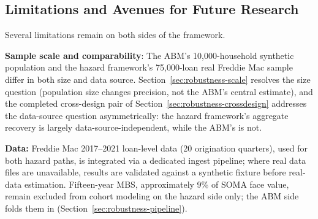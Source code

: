\documentclass[12pt]{article}
\begin{document}
\subsection{Limitations and Avenues for Future Research}\label{sec:limitations}

Several limitations remain on both sides of the framework.

\textbf{Sample scale and comparability}: The ABM's 10,000-household synthetic population and the hazard framework's 75,000-loan real Freddie Mac sample differ in both size and data source. Section~\ref{sec:robustness-scale} resolves the size question (population size changes precision, not the ABM's central estimate), and the completed cross-design pair of Section~\ref{sec:robustness-crossdesign} addresses the data-source question asymmetrically: the hazard framework's aggregate recovery is largely data-source-independent, while the ABM's is not.

\textbf{Data:} Freddie Mac 2017--2021 loan-level data (20 origination quarters), used for both hazard paths, is integrated via a dedicated ingest pipeline; where real data files are unavailable, results are validated against a synthetic fixture before real-data estimation. Fifteen-year MBS, approximately 9\% of SOMA face value, remain excluded from cohort modeling on the hazard side only; the ABM side folds them in (Section~\ref{sec:robustness-pipeline}).
\end{document}
